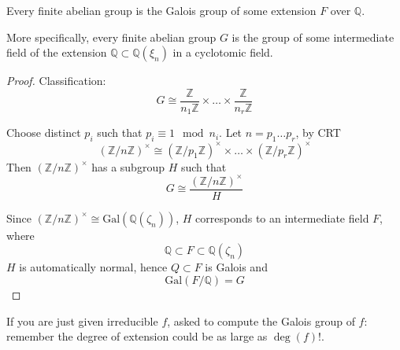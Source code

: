 \documentclass[openany]{book}
\newcommand{\Z}{\mathbb{Z}}
\newcommand{\Q}{\mathbb{Q}}
\newcommand{\gal}{\text{Gal}}
\begin{document}
\begin{prop}
    Every finite abelian group is the Galois group of some extension $F$ over $\Q$. 

    More specifically, every finite abelian group $G$ is the group of some intermediate field of the extension $\Q\subset\Q(\xi_n)$ in a cyclotomic field.
\end{prop}
\begin{proof}
    Classification:
    \begin{equation*}
        G\cong\frac{\Z}{n_1\Z}\times\dots\times\frac{\Z}{n_r\Z}
    \end{equation*}

    Choose distinct $p_i$ such that $p_i\equiv 1\mod n_i$. Let $n=p_1\dots p_r$, by CRT 
    \begin{equation*}
        \left(\Z/n\Z\right)^\times\cong \left(\Z/p_1\Z\right)^\times\times\dots\times \left(\Z/p_r\Z\right)^\times
    \end{equation*}
    Then $\left(\Z/n\Z\right)^\times$ has a subgroup $H$ such that 
    \begin{equation*}
        G\cong\frac{\left(\Z/n\Z\right)^\times}{H}
    \end{equation*}
    

    Since $\left(\Z/n\Z\right)^\times\cong\gal(\Q(\zeta_n))$, $H$ corresponds to an intermediate field $F$, where 
    \begin{equation*}
        \Q\subset F\subset\Q(\zeta_n)
    \end{equation*}
    $H$ is automatically normal, hence $Q\subset F$ is Galois and 
    \begin{equation*}
        \gal(F/\Q)=G
    \end{equation*}
\end{proof}

\begin{warn}
    If you are just given irreducible $f$, asked to compute the Galois group of $f$: remember the degree of extension could be as large as $\deg(f)!$. 
\end{warn}
\end{document}
